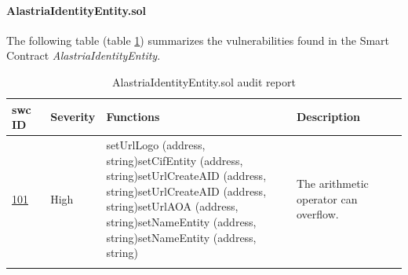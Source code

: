 \documentclass[a4paper, 12pt]{article} %
\begin{document}
            \paragraph{AlastriaIdentityEntity.sol}
                The following table (table \ref{tab:AlastriaIdentityEntity}) summarizes the vulnerabilities found in the Smart Contract \textit{AlastriaIdentityEntity}.
                \begin{longtable}{||p{0.1\linewidth} | p{0.11\linewidth} | p{0.5\linewidth} | p{0.3\linewidth}||}
                    \hline
                    \textbf{\acrshort{swc} ID} & \textbf{Severity} & \textbf{Functions} & \textbf{Description} \\ [0.5ex] 
                    \hline\hline
                    \href{https://swcregistry.io/docs/SWC-101}{101} & High & setUrlLogo (address, string)\newline setCifEntity (address, string)\newline setUrlCreateAID (address, string)\newline setUrlCreateAID (address, string)\newline setUrlAOA (address, string)\newline setNameEntity (address, string)\newline setNameEntity (address, string)\newline & The arithmetic operator can overflow. \\ [1ex] 
                    \hline
                    \caption{AlastriaIdentityEntity.sol audit report}
                    \label{tab:AlastriaIdentityEntity}
                \end{longtable}
                
\end{document}
